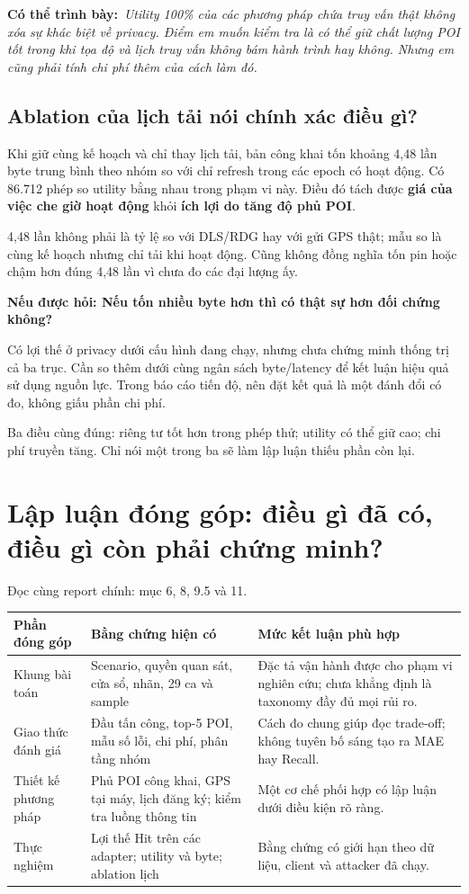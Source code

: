 \documentclass[10pt,a4paper]{article}
\newcommand{\key}[1]{\par\smallskip\noindent\colorbox{pale}{\parbox{\dimexpr\linewidth-2\fboxsep}{#1}}\par\smallskip}
\newcommand{\say}[1]{\par\textbf{Có thể trình bày:}\ \textit{#1}\par}
\newcommand{\ask}[2]{\par\textbf{Nếu được hỏi: #1}\par #2\par}
\newcommand{\where}[1]{\par{\small\color{gray}Đọc cùng report chính: #1.}\par}
\newcommand{\guidepage}[1]{\clearpage\section{#1}}
\begin{document}
\say{Utility 100\% của các phương pháp chứa truy vấn thật không xóa sự khác biệt về privacy. Điểm em muốn kiểm tra là có thể giữ chất lượng POI tốt trong khi tọa độ và lịch truy vấn không bám hành trình hay không. Nhưng em cũng phải tính chi phí thêm của cách làm đó.}

\subsection*{Ablation của lịch tải nói chính xác điều gì?}
Khi giữ cùng kế hoạch và chỉ thay lịch tải, bản công khai tốn khoảng 4,48 lần byte trung bình theo nhóm so với chỉ refresh trong các epoch có hoạt động. Có 86.712 phép so utility bằng nhau trong phạm vi này. Điều đó tách được \textbf{giá của việc che giờ hoạt động} khỏi \textbf{ích lợi do tăng độ phủ POI}.

4,48 lần không phải là tỷ lệ so với DLS/RDG hay với gửi GPS thật; mẫu so là cùng kế hoạch nhưng chỉ tải khi hoạt động. Cũng không đồng nghĩa tốn pin hoặc chậm hơn đúng 4,48 lần vì chưa đo các đại lượng ấy.

\ask{Nếu tốn nhiều byte hơn thì có thật sự hơn đối chứng không?}{Có lợi thế ở privacy dưới cấu hình đang chạy, nhưng chưa chứng minh thống trị cả ba trục. Cần so thêm dưới cùng ngân sách byte/latency để kết luận hiệu quả sử dụng nguồn lực. Trong báo cáo tiến độ, nên đặt kết quả là một đánh đổi có đo, không giấu phần chi phí.}
\key{Ba điều cùng đúng: riêng tư tốt hơn trong phép thử; utility có thể giữ cao; chi phí truyền tăng. Chỉ nói một trong ba sẽ làm lập luận thiếu phần còn lại.}

\guidepage{Lập luận đóng góp: điều gì đã có, điều gì còn phải chứng minh?}
\where{mục 6, 8, 9.5 và 11}
\begin{longtable}{@{}P{3.8cm}P{6.0cm}P{6.4cm}@{}}
\toprule Phần đóng góp & Bằng chứng hiện có & Mức kết luận phù hợp\\\midrule
Khung bài toán & Scenario, quyền quan sát, cửa sổ, nhãn, 29 ca và sample & Đặc tả vận hành được cho phạm vi nghiên cứu; chưa khẳng định là taxonomy đầy đủ mọi rủi ro.\\[5pt]
Giao thức đánh giá & Đầu tấn công, top-5 POI, mẫu số lỗi, chi phí, phân tầng nhóm & Cách đo chung giúp đọc trade-off; không tuyên bố sáng tạo ra MAE hay Recall.\\[5pt]
Thiết kế phương pháp & Phủ POI công khai, GPS tại máy, lịch đăng ký; kiểm tra luồng thông tin & Một cơ chế phối hợp có lập luận dưới điều kiện rõ ràng.\\[5pt]
Thực nghiệm & Lợi thế Hit trên các adapter; utility và byte; ablation lịch & Bằng chứng có giới hạn theo dữ liệu, client và attacker đã chạy.\\
\bottomrule
\end{longtable}
\end{document}
